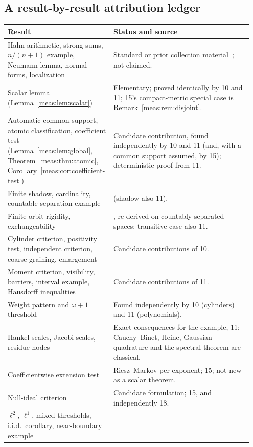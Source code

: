 \documentclass[11pt]{article}
\numberwithin{equation}{section}
\theoremstyle{definition}
\theoremstyle{remark}
\begin{document}
\subsection{A result-by-result attribution ledger}

\begingroup\small
\begin{longtable}{@{}>{\raggedright\arraybackslash}p{0.38\linewidth}
                    >{\raggedright\arraybackslash}p{0.57\linewidth}@{}}
\toprule
Result & Status and source\\
\midrule
\endhead
Hahn arithmetic, strong sums, $n/(n+1)$ example, Neumann lemma, normal forms,
localization & Standard or prior collection material~\cite{repofound,Neumann,Gonshor,BG};
not claimed.\\[3pt]
Scalar lemma (Lemma~\ref{meas:lem:scalar}) & Elementary; proved identically by 10 and
11; 15's compact-metric special case is Remark~\ref{meas:rem:disjoint}.\\[3pt]
Automatic common support, atomic classification, coefficient test
(Lemma~\ref{meas:lem:global}, Theorem~\ref{meas:thm:atomic},
Corollary~\ref{meas:cor:coefficient-test}) & Candidate contribution, found
independently by 10 and 11 (and, with a common support assumed, by 15);
deterministic proof from 11.\\[3pt]
Finite shadow, cardinality, countable-separation example & 10 (shadow also 11).\\[3pt]
Finite-orbit rigidity, exchangeability & 15, re-derived on countably separated
spaces; transitive case also 11.\\[3pt]
Cylinder criterion, positivity test, independent criterion, coarse-graining,
enlargement & Candidate contributions of 10.\\[3pt]
Moment criterion, visibility, barriers, interval example, Hausdorff
inequalities & Candidate contributions of 11.\\[3pt]
Weight pattern and $\omega+1$ threshold & Found independently by 10 (cylinders) and
11 (polynomials).\\[3pt]
Hankel scales, Jacobi scales, residue nodes & Exact consequences for the example,
11; Cauchy--Binet, Heine, Gaussian quadrature and the spectral theorem are
classical.\\[3pt]
Coefficientwise extension test & Riesz--Markov per exponent; 15; not new as a
scalar theorem.\\[3pt]
Null-ideal criterion & Candidate formulation; 15, and independently 18.\\[3pt]
$\ell^2$, $\ell^1$, mixed thresholds, i.i.d.\ corollary, near-boundary example &

\end{longtable}
\end{document}
